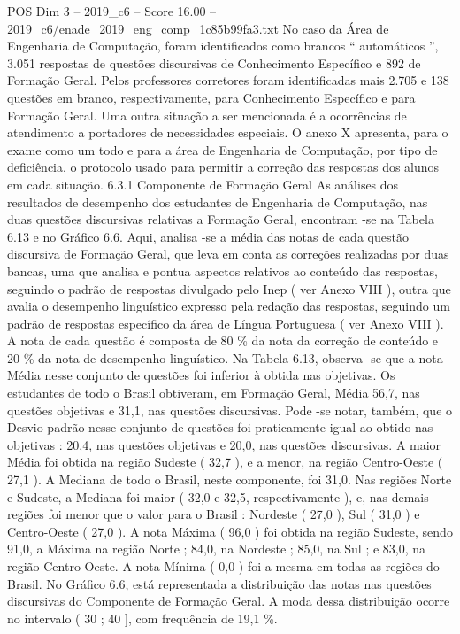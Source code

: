 \begin{textsample}{POS Dim 3 – 2019\_c6 – Score 16.00 – 2019\_c6/enade\_2019\_eng\_comp\_1c85b99fa3.txt}
No caso da Área de Engenharia de Computação, foram identificados como brancos “ automáticos ”, 3.051 respostas de questões discursivas de Conhecimento Específico e 892 de Formação Geral.
Pelos professores corretores foram identificadas mais 2.705 e 138 questões em branco, respectivamente, para Conhecimento Específico e para Formação Geral.
Uma outra situação a ser mencionada é a ocorrências de atendimento a portadores de necessidades especiais.
O anexo X apresenta, para o exame como um todo e para a área de Engenharia de Computação, por tipo de deficiência, o protocolo usado para permitir a correção das respostas dos alunos em cada situação. 6.3.1 Componente de Formação Geral As análises dos resultados de desempenho dos estudantes de Engenharia de Computação, nas duas questões discursivas relativas a Formação Geral, encontram -se na Tabela 6.13 e no Gráfico 6.6.
Aqui, analisa -se a média das notas de cada questão discursiva de Formação Geral, que leva em conta as correções realizadas por duas bancas, uma que analisa e pontua aspectos relativos ao conteúdo das respostas, seguindo o padrão de respostas divulgado pelo Inep ( ver Anexo VIII ), outra que avalia o desempenho linguístico expresso pela redação das respostas, seguindo um padrão de respostas específico da área de Língua Portuguesa ( ver Anexo VIII ).
A nota de cada questão é composta de 80 \% da nota da correção de conteúdo e 20 \% da nota de desempenho linguístico.
Na Tabela 6.13, observa -se que a nota Média nesse conjunto de questões foi inferior à obtida nas objetivas.
Os estudantes de todo o Brasil obtiveram, em Formação Geral, Média 56,7, nas questões objetivas e 31,1, nas questões discursivas.
Pode -se notar, também, que o Desvio padrão nesse conjunto de questões foi praticamente igual ao obtido nas objetivas : 20,4, nas questões objetivas e 20,0, nas questões discursivas.
A maior Média foi obtida na região Sudeste ( 32,7 ), e a menor, na região Centro-Oeste ( 27,1 ).
A Mediana de todo o Brasil, neste componente, foi 31,0.
Nas regiões Norte e Sudeste, a Mediana foi maior ( 32,0 e 32,5, respectivamente ), e, nas demais regiões foi menor que o valor para o Brasil : Nordeste ( 27,0 ), Sul ( 31,0 ) e Centro-Oeste ( 27,0 ).
A nota Máxima ( 96,0 ) foi obtida na região Sudeste, sendo 91,0, a Máxima na região Norte ; 84,0, na Nordeste ; 85,0, na Sul ; e 83,0, na região Centro-Oeste.
A nota Mínima ( 0,0 ) foi a mesma em todas as regiões do Brasil.
No Gráfico 6.6, está representada a distribuição das notas nas questões discursivas do Componente de Formação Geral.
A moda dessa distribuição ocorre no intervalo ( 30 ; 40 ], com frequência de 19,1 \%.

\end{textsample}
